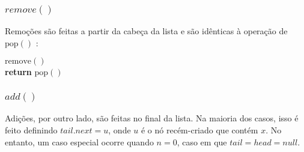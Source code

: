 \documentclass{beamer}
\begin{document}
\begin{frame}
\frametitle{$remove()$}
Remoções são feitas a partir da cabeça da lista e são idênticas à operação de $ \ensuremath{\mathrm{pop}()}$ :
\begin{framed}
\begin{flushleft}
\hspace*{1em} \ensuremath{\mathrm{remove}()}\\
\hspace*{1em} \hspace*{1em} {\color{black} \textbf{return}} \ensuremath{\mathrm{pop}()}\\
\end{flushleft}
\end{framed} 
\end{frame}

\begin{frame}
\frametitle{$add()$}
{\small Adições, por outro lado, são feitas no final da lista. Na maioria dos casos, isso é feito definindo $tail.next=u$, onde $u$ é o nó recém-criado que contém $x$. 
No entanto, um caso especial ocorre quando $n=0$, caso em que $tail=head=null$. 

}
\end{frame}
\end{document}
